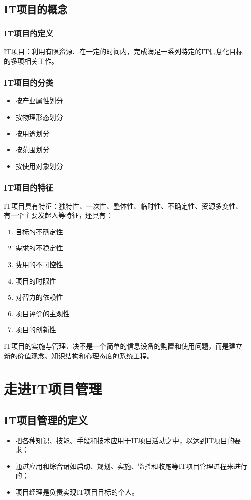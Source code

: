 \subsection{IT项目的概念}
\subsubsection*{IT项目的定义}
IT项目：利用有限资源、在一定的时间内，完成满足一系列特定的IT信息化目标的多项相关工作。
\subsubsection*{IT项目的分类}
\begin{itemize}
	\item 按产业属性划分
	\item 按物理形态划分
	\item 按用途划分
	\item 按范围划分
	\item 按使用对象划分
\end{itemize}
\subsubsection*{IT项目的特征}
IT项目具有特征：独特性、一次性、整体性、临时性、不确定性、资源多变性、有一个主要发起人等特征，还具有：
\begin{enumerate}
	\item 目标的不确定性
	\item 需求的不稳定性
	\item 费用的不可控性
	\item 项目的时限性
 	\item 对智力的依赖性
	\item 项目评价的主观性
	\item 项目的创新性
\end{enumerate}
\par IT项目的实施与管理，决不是一个简单的信息设备的购置和使用问题，而是建立新的价值观念、知识结构和心理态度的系统工程。
\section{走进IT项目管理}
\subsection{IT项目管理的定义}
\begin{itemize}
	\item 把各种知识、技能、手段和技术应用于IT项目活动之中，以达到IT项目的要求；
	\item 通过应用和综合诸如启动、规划、实施、监控和收尾等IT项目管理过程来进行的；
	\item 项目经理是负责实现IT项目目标的个人。
\end{itemize}

